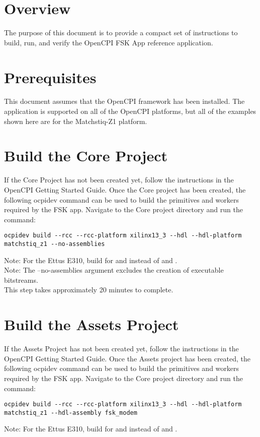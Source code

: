 \newpage
\begin{flushleft}
\section{Overview}
The purpose of this document is to provide a compact set of instructions to build, run, and verify the OpenCPI FSK App reference application.

\section{Prerequisites}
This document assumes that the OpenCPI framework has been installed. The application is supported on all of the OpenCPI platforms, but all of the examples shown here are for the Matchstiq-Z1 platform.

\section{Build the Core Project}
If the Core Project has not been created yet, follow the instructions in the OpenCPI Getting Started Guide. Once the Core project has been created, the following ocpidev command can be used to build the primitives and workers required by the FSK app. Navigate to the Core project directory and run the command:
\begin{verbatim}
ocpidev build --rcc --rcc-platform xilinx13_3 --hdl --hdl-platform matchstiq_z1 --no-assemblies
\end{verbatim}

Note: For the Ettus E310, build for  and  instead of  and .\\

Note: The --no-assemblies argument excludes the creation of executable bitstreams.\\
This step takes approximately 20 minutes to complete.\\

\section{Build the Assets Project}
If the Assets Project has not been created yet, follow the instructions in the OpenCPI Getting Started Guide. Once the Assets project has been created, the following ocpidev command can be used to build the primitives and workers required by the FSK app. Navigate to the Core project directory and run the command:
\begin{verbatim}
ocpidev build --rcc --rcc-platform xilinx13_3 --hdl --hdl-platform matchstiq_z1 --hdl-assembly fsk_modem
\end{verbatim}
Note: For the Ettus E310, build for  and  instead of  and .\\


\end{flushleft}
